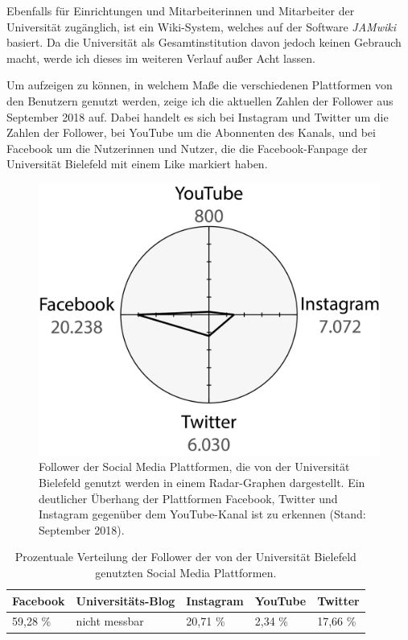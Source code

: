 Ebenfalls für Einrichtungen und Mitarbeiterinnen und Mitarbeiter der Universität zugänglich, ist ein Wiki-System, welches auf der Software \textit{JAMwiki} basiert. Da die Universität als Gesamtinstitution davon jedoch keinen Gebrauch macht, werde ich dieses im weiteren Verlauf außer Acht lassen.

Um aufzeigen zu können, in welchem Maße die verschiedenen Plattformen von den Benutzern genutzt werden, zeige ich die aktuellen Zahlen der Follower aus September 2018 auf. Dabei handelt es sich bei Instagram und Twitter um die Zahlen der Follower, bei YouTube um die Abonnenten des Kanals, und bei Facebook um die Nutzerinnen und Nutzer, die die Facebook-Fanpage der Universität Bielefeld mit einem Like markiert haben.


\begin{figure}[h]    
    \centering
    \includegraphics[width=.8\textwidth]{img/posts/follower_gesamt.png}
    \caption{Follower der Social Media Plattformen, die von der Universität Bielefeld genutzt werden in einem Radar-Graphen dargestellt. Ein deutlicher Überhang der Plattformen Facebook, Twitter und Instagram gegenüber dem YouTube-Kanal ist zu erkennen (Stand: September 2018).}
    \label{fig:follower}
\end{figure}

\begin{table}[h]
    \centering
        \caption{Prozentuale Verteilung der Follower der von der Universität Bielefeld genutzten Social Media Plattformen.}
        \begin{tabular}{*{5}{l}}
        Facebook & Universitäts-Blog & Instagram & YouTube & Twitter \\
        \hline
        59,28 \% & nicht messbar & 20,71 \% & 2,34 \% & 17,66 \%
        \end{tabular}
    \label{tab:followerprozent}
\end{table}


